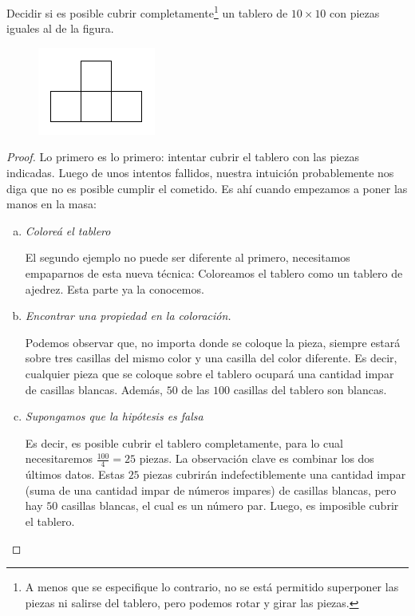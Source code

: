 \begin{ejem} \label{ejemplotetramino}
	Decidir si es posible cubrir completamente\footnote{A menos  que se especifique lo contrario, no se est\'a permitido superponer las piezas ni salirse del tablero, pero podemos rotar y girar las piezas.} un tablero de $10 \times 10 $ con piezas iguales al de la figura.
	
	\begin{figure}[h!]
		\centering
		\includegraphics[scale=.8]{imgs/color3.png}
	\end{figure}
\end{ejem}
\begin{proof}
	Lo primero es lo primero: intentar cubrir el tablero con las piezas indicadas. Luego de unos intentos fallidos, nuestra intuici\'on probablemente nos diga que no es posible cumplir el cometido. Es ah\'i cuando empezamos a poner las manos en la masa:
	
	\begin{enumerate}[a.]
		
		\item \textit{Colore\'a el tablero}
		
		El segundo ejemplo no puede ser diferente al primero, necesitamos empaparnos de esta nueva t\'ecnica: Coloreamos el tablero como un tablero de ajedrez. Esta parte ya la conocemos.
		
		\item \textit{Encontrar una propiedad en la coloraci\'on.}
		
		Podemos observar que, no importa donde se coloque la pieza, siempre estar\'a sobre tres casillas del mismo color y una casilla del color diferente. Es decir, cualquier pieza que se coloque sobre el tablero ocupar\'a una cantidad impar de casillas blancas. Adem\'as, $50$ de las $100$ casillas del tablero son blancas.
		
		\item \textit{Supongamos que la hip\'otesis es falsa}
		
		Es decir, es posible cubrir el tablero completamente, para lo cual necesitaremos $\frac{100}{4} = 25$ piezas. La observaci\'on clave es combinar los dos \'ultimos datos. Estas $25$ piezas cubrir\'an indefectiblemente una cantidad impar (suma de una cantidad impar de n\'umeros impares) de casillas blancas, pero hay $50$ casillas blancas, el cual es un n\'umero par. Luego, es imposible cubrir el tablero.
	\end{enumerate}
\end{proof}

